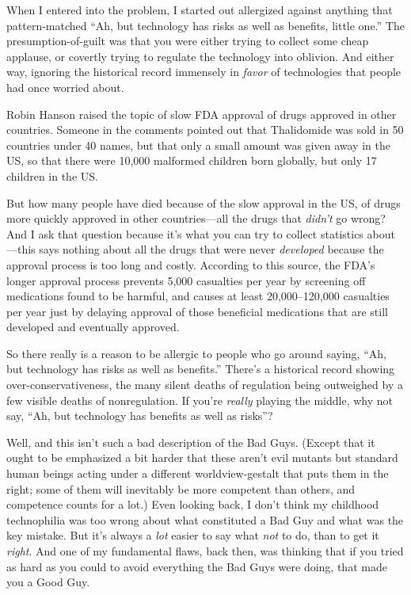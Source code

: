 {
 When I entered into the problem, I started out allergized against
anything that pattern-matched ``Ah, but technology has
risks as well as benefits, little one.'' The
presumption-of-guilt was that you were either trying to collect some
cheap applause, or covertly trying to regulate the technology into
oblivion. And either way, ignoring the historical record immensely in
\textit{favor} of technologies that people had once worried about.}

{
 Robin Hanson raised the topic of slow FDA approval of drugs
approved in other countries. Someone in the comments pointed out that
Thalidomide was sold in 50 countries under 40 names, but that only a
small amount was given away in the US, so that there were 10,000
malformed children born globally, but only 17 children in the US.}

{
 But how many people have died because of the slow approval in the
US, of drugs more quickly approved in other countries---all the drugs
that \textit{didn't} go wrong? And I ask that question
because it's what you can try to collect statistics
about---this says nothing about all the drugs that were never
\textit{developed} because the approval process is too long and costly.
According to this source, the FDA's longer approval
process prevents 5,000 casualties per year by screening off medications
found to be harmful, and causes at least 20,000--120,000 casualties per
year just by delaying approval of those beneficial medications that are
still developed and eventually approved.}

{
 So there really is a reason to be allergic to people who go around
saying, ``Ah, but technology has risks as well as
benefits.'' There's a historical
record showing over-conservativeness, the many silent deaths of
regulation being outweighed by a few visible deaths of nonregulation.
If you're \textit{really} playing the middle, why not
say, ``Ah, but technology has benefits as well as
risks''?}

{
 Well, and this isn't such a bad description of the
Bad Guys. (Except that it ought to be emphasized a bit harder that
these aren't evil mutants but standard human beings
acting under a different worldview-gestalt that puts them in the right;
some of them will inevitably be more competent than others, and
competence counts for a lot.) Even looking back, I
don't think my childhood technophilia was too wrong
about what constituted a Bad Guy and what was the key mistake. But
it's always a \textit{lot} easier to say what
\textit{not} to do, than to get it \textit{right}. And one of my
fundamental flaws, back then, was thinking that if you tried as hard as
you could to avoid everything the Bad Guys were doing, that made you a
Good Guy.}

